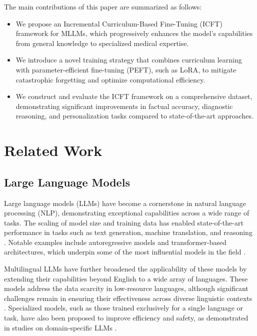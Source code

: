 The main contributions of this paper are summarized as follows:
\begin{itemize}
    \item We propose an Incremental Curriculum-Based Fine-Tuning (ICFT) framework for MLLMs, which progressively enhances the model's capabilities from general knowledge to specialized medical expertise.
    \item We introduce a novel training strategy that combines curriculum learning with parameter-efficient fine-tuning (PEFT), such as LoRA, to mitigate catastrophic forgetting and optimize computational efficiency.
    \item We construct and evaluate the ICFT framework on a comprehensive dataset, demonstrating significant improvements in factual accuracy, diagnostic reasoning, and personalization tasks compared to state-of-the-art approaches.
\end{itemize}


\section{Related Work}

\subsection{Large Language Models}

Large language models (LLMs) have become a cornerstone in natural language processing (NLP), demonstrating exceptional capabilities across a wide range of tasks. The scaling of model size and training data has enabled state-of-the-art performance in tasks such as text generation, machine translation, and reasoning \cite{zhou2023thread,zhou2021triple}. Notable examples include autoregressive models and transformer-based architectures, which underpin some of the most influential models in the field \cite{nicholas2023lost,mueller2022cedille}.

Multilingual LLMs have further broadened the applicability of these models by extending their capabilities beyond English to a wide array of languages. These models address the data scarcity in low-resource languages, although significant challenges remain in ensuring their effectiveness across diverse linguistic contexts \cite{ojo2023african,chang2024goldfish}. Specialized models, such as those trained exclusively for a single language or task, have also been proposed to improve efficiency and safety, as demonstrated in studies on domain-specific LLMs \cite{ma2024llamareg,liu2024bioinformatics}.

